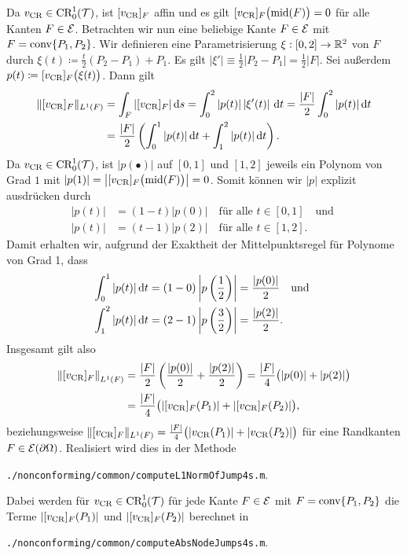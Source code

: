 Da $v_\textup{CR}\in\textup{CR}^1_0(\mathcal{T})$, ist $[v_\textup{CR}]_F$ affin und es gilt
$[v_\textup{CR}]_F\big(\textup{mid}(F)\big)=0$ für alle Kanten $F\in\mathcal{E}$.
Betrachten wir nun eine beliebige Kante $F\in\mathcal{E}$ mit $F=\textup{conv}\{P_1,P_2\}$. 
Wir definieren eine Parametrisierung $\xi:[0,2]\to\mathbb{R}^2$ von $F$ durch
$\xi(t)\coloneqq \frac{t}{2}(P_2-P_1)+P_1$. 
Es gilt $\left|\xi'\right|\equiv \frac{1}{2}|P_2-P_1|=\frac{1}{2}|F|$.
Sei außerdem
$p(t)\coloneqq [v_\textup{CR}]_F\big(\xi(t)\big)$. Dann gilt
\begin{align*}
  \Vert [v_\textup{CR}]_F\Vert_{L^1(F)} 
  &=
  \int_F |[v_\textup{CR}]_F|\,\mathrm{d}s 
  = \int_0^2 |p(t)|\left|\xi'(t)\right|\,\mathrm{d}t
  = \frac{|F|}{2}\int_0^2 |p(t)|\,\mathrm{d}t\\
  &= \frac{|F|}{2}\left(\int_0^1 |p(t)|\,\mathrm{d}t + \int_1^2 |p(t)|\,\mathrm{d}t\right).
\end{align*}
Da $v_\textup{CR}\in\textup{CR}^1_0(\mathcal{T})$, ist $|p(\bullet)|$ auf $[0,1]$ und $[1,2]$ jeweils
ein Polynom von Grad $1$ mit $|p(1)|=\left|[v_\textup{CR}]_F\big(\textup{mid}(F)\big)\right|=0$. 
Somit können wir $|p|$ explizit ausdrücken durch
\begin{align*}
  |p(t)|&=(1-t)|p(0)| \quad\text{für alle }t\in[0,1] \quad\text{und }\\
  |p(t)|&=(t-1)|p(2)| \quad\text{für alle }t\in[1,2].
\end{align*}
Damit erhalten wir, aufgrund der Exaktheit der Mittelpunktsregel für Polynome
von Grad 1, dass
\begin{align*}
  \int_0^1 |p(t)|\,\mathrm{d}t 
  &= 
  (1-0)\left|p\left( \frac{1}{2} \right)\right|
  =
  \frac{|p(0)|}{2}\quad\text{und }\\
  \int_1^2 |p(t)|\,\mathrm{d}t 
  &= 
  (2-1)\left|p\left( \frac{3}{2} \right)\right|
  =
  \frac{|p(2)|}{2}.
\end{align*}
Insgesamt gilt also
\begin{align*}
  \left\Vert [v_\textup{CR}]_F\right\Vert_{L^1(F)} 
  &=
  \frac{|F|}{2}\left(\frac{|p(0)|}{2} + \frac{|p(2)|}{2}\right)
  =
  \frac{|F|}{4}\big(|p(0)|+|p(2)|\big)\\
  &= 
  \frac{|F|}{4}\big(|[v_\textup{CR}]_F(P_1)|+|[v_\textup{CR}]_F(P_2)|\big),
\end{align*}
beziehungsweise 
  $\Vert [v_\textup{CR}]_F\Vert_{L^1(F)} =
  \frac{|F|}{4}\big(|v_\textup{CR}(P_1)|+|v_\textup{CR}(P_2)|\big)$ für eine Randkanten
  $F\in\mathcal{E}(\partial\Omega)$.
Realisiert wird dies in der Methode
\begin{center}
  \texttt{./nonconforming/common/computeL1NormOfJump4s.m}.
\end{center}
Dabei werden für $v_\textup{CR}\in\textup{CR}^1_0(\mathcal{T})$ für jede Kante $F\in\mathcal{E}$ mit
$F=\textup{conv}\{P_1,P_2\}$ die Terme $|[v_\textup{CR}]_F(P_1)|$ und $|[v_\textup{CR}]_F(P_2)|$
berechnet in
\begin{center}
  \texttt{./nonconforming/common/computeAbsNodeJumps4s.m}.
\end{center}


